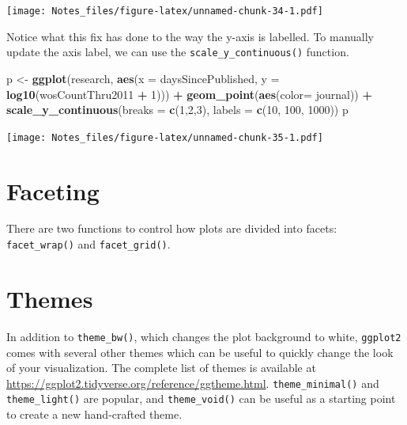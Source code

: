 \documentclass[
]{book}
\newenvironment{Shaded}{\begin{snugshade}}{\end{snugshade}}
\newcommand{\DataTypeTok}[1]{\textcolor[rgb]{0.13,0.29,0.53}{#1}}
\newcommand{\DecValTok}[1]{\textcolor[rgb]{0.00,0.00,0.81}{#1}}
\newcommand{\KeywordTok}[1]{\textcolor[rgb]{0.13,0.29,0.53}{\textbf{#1}}}
\newcommand{\NormalTok}[1]{#1}
\newcommand{\OperatorTok}[1]{\textcolor[rgb]{0.81,0.36,0.00}{\textbf{#1}}}
\newcommand{\StringTok}[1]{\textcolor[rgb]{0.31,0.60,0.02}{#1}}
\begin{document}
\texttt{[image: Notes\_files/figure-latex/unnamed-chunk-34-1.pdf]}

Notice what this fix has done to the way the y-axis is labelled. To manually update the axis label, we can use the \texttt{scale\_y\_continuous()} function.

\begin{Shaded}
\begin{Highlighting}[]
\NormalTok{p <-}\StringTok{ }\KeywordTok{ggplot}\NormalTok{(research, }\KeywordTok{aes}\NormalTok{(}\DataTypeTok{x =}\NormalTok{ daysSincePublished, }
                          \DataTypeTok{y =} \KeywordTok{log10}\NormalTok{(wosCountThru2011 }\OperatorTok{+}\StringTok{ }\DecValTok{1}\NormalTok{))) }\OperatorTok{+}\StringTok{ }
\StringTok{  }\KeywordTok{geom_point}\NormalTok{(}\KeywordTok{aes}\NormalTok{(}\DataTypeTok{color=}\NormalTok{ journal)) }\OperatorTok{+}
\StringTok{  }\KeywordTok{scale_y_continuous}\NormalTok{(}\DataTypeTok{breaks =} \KeywordTok{c}\NormalTok{(}\DecValTok{1}\NormalTok{,}\DecValTok{2}\NormalTok{,}\DecValTok{3}\NormalTok{), }\DataTypeTok{labels =} \KeywordTok{c}\NormalTok{(}\DecValTok{10}\NormalTok{, }\DecValTok{100}\NormalTok{, }\DecValTok{1000}\NormalTok{))}
\NormalTok{p}
\end{Highlighting}
\end{Shaded}

\texttt{[image: Notes\_files/figure-latex/unnamed-chunk-35-1.pdf]}

\hypertarget{faceting}{%
\section{Faceting}\label{faceting}}

There are two functions to control how plots are divided into facets: \texttt{facet\_wrap()} and \texttt{facet\_grid()}.

\hypertarget{themes}{%
\section{Themes}\label{themes}}

In addition to \texttt{theme\_bw()}, which changes the plot background to white, \texttt{ggplot2} comes with several other themes which can be useful to quickly change the look of your visualization. The complete list of themes is available at \url{https://ggplot2.tidyverse.org/reference/ggtheme.html}. \texttt{theme\_minimal()} and \texttt{theme\_light()} are popular, and \texttt{theme\_void()} can be useful as a starting point to create a new hand-crafted theme.
\end{document}
